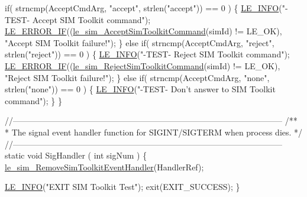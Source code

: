 \begin{DoxyCodeInclude}
{{{{    \textcolor{keywordflow}{if}( strncmp(AcceptCmdArg, \textcolor{stringliteral}{"accept"}, strlen(\textcolor{stringliteral}{"accept"})) == 0 )
    \{
        \hyperlink{le__log_8h_a23e6d206faa64f612045d688cdde5808}{LE\_INFO}(\textcolor{stringliteral}{"-TEST- Accept SIM Toolkit command"});
        \hyperlink{le__log_8h_aceaf11a11691d6c676e36dd317b38dbd}{LE\_ERROR\_IF}((\hyperlink{le__sim__interface_8h_a8cc75a17466446c19c5bd941b1360e0e}{le\_sim\_AcceptSimToolkitCommand}(simId) != 
      LE\_OK),
                    \textcolor{stringliteral}{"Accept SIM Toolkit failure!"});
    \}
    \textcolor{keywordflow}{else} \textcolor{keywordflow}{if}( strncmp(AcceptCmdArg, \textcolor{stringliteral}{"reject"}, strlen(\textcolor{stringliteral}{"reject"})) == 0 )
    \{
        \hyperlink{le__log_8h_a23e6d206faa64f612045d688cdde5808}{LE\_INFO}(\textcolor{stringliteral}{"-TEST- Reject SIM Toolkit command"});
        \hyperlink{le__log_8h_aceaf11a11691d6c676e36dd317b38dbd}{LE\_ERROR\_IF}((\hyperlink{le__sim__interface_8h_a8cbdc50d62ddd5ea80386d27e16d954f}{le\_sim\_RejectSimToolkitCommand}(simId) != 
      LE\_OK),
                    \textcolor{stringliteral}{"Reject SIM Toolkit failure!"});
    \}
    \textcolor{keywordflow}{else} \textcolor{keywordflow}{if}( strncmp(AcceptCmdArg, \textcolor{stringliteral}{"none"}, strlen(\textcolor{stringliteral}{"none"})) == 0 )
    \{
        \hyperlink{le__log_8h_a23e6d206faa64f612045d688cdde5808}{LE\_INFO}(\textcolor{stringliteral}{"-TEST- Don't answer to SIM Toolkit command"});
    \}
\}

\textcolor{comment}{//--------------------------------------------------------------------------------------------------}\textcolor{comment}{}
\textcolor{comment}{/**}
\textcolor{comment}{ * The signal event handler function for SIGINT/SIGTERM when process dies.}
\textcolor{comment}{ */}
\textcolor{comment}{//--------------------------------------------------------------------------------------------------}
\textcolor{keyword}{static} \textcolor{keywordtype}{void} SigHandler
(
    \textcolor{keywordtype}{int} sigNum
)
\{
    \hyperlink{le__sim__interface_8h_a2485840533f80632a61096b1d7c5d8f2}{le\_sim\_RemoveSimToolkitEventHandler}(HandlerRef);

    \hyperlink{le__log_8h_a23e6d206faa64f612045d688cdde5808}{LE\_INFO}(\textcolor{stringliteral}{"EXIT SIM Toolkit Test"});
    exit(EXIT\_SUCCESS);
\}

}}}}
\end{DoxyCodeInclude}
